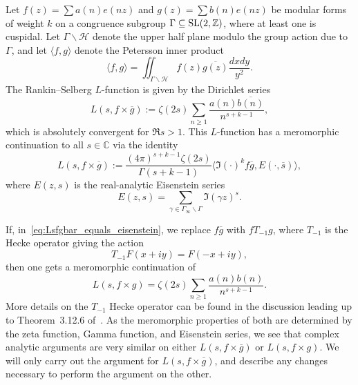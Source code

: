 Let $f(z) = \sum a(n) e(nz)$ and $g(z) = \sum b(n) e(nz)$ be modular forms of weight $k$
on a congruence subgroup $\Gamma \subseteq \operatorname{SL}(2, \mathbb{Z})$, where at least one is
cuspidal.
Let $\Gamma \backslash \mathcal{H}$ denote the upper half plane modulo the group action
due to $\Gamma$, and let $\langle f, g \rangle$ denote the Petersson inner product
\begin{equation}
  \langle f, g \rangle = \iint_{\Gamma \backslash \mathcal{H}} f(z) \overline{g(z)}
  \frac{dx dy}{y^2}.
\end{equation}
The Rankin--Selberg $L$-function is given by the Dirichlet series %
\begin{equation}
  L(s, f\times \overline{g}) := \zeta(2s) \sum_{n \geq 1} \frac{a(n) \overline{b(n)}}{n^{s
  + k - 1}},
\end{equation}
which is absolutely convergent for $\Re s > 1$.
This $L$-function has a meromorphic continuation to all $s \in \mathbb{C}$ via the
identity
\begin{equation}\label{eq:Lsfgbar_equals_eisenstein}
  L(s, f\times \overline{g}) := \frac{(4\pi)^{s + k - 1} \zeta(2s)}{\Gamma(s + k - 1)}
  \langle \Im(\cdot)^k f \overline{g}, E(\cdot, \overline{s})\rangle,
\end{equation}
where $E(z,s)$ is the real-analytic Eisenstein series
\begin{equation}\label{eq:eisenstein_def}
  E(z,s) = \sum_{\gamma \in \Gamma_\infty \backslash \Gamma} \Im(\gamma z)^s.
\end{equation}



If, in~\eqref{eq:Lsfgbar_equals_eisenstein}, we replace $f \overline{g}$ with $f T_{-1}g$,
where $T_{-1}$ is the Hecke operator giving the action
\begin{equation}
  T_{-1} F(x + iy) = F(-x + iy),
\end{equation}
then one gets a meromorphic continuation of
\begin{equation}
  L(s, f\times g) = \zeta(2s) \sum_{n \geq 1} \frac{a(n) b(n)}{n^{s + k - 1}}.
\end{equation}
More details on the $T_{-1}$ Hecke operator can be found in the discussion leading up to
Theorem~3.12.6 of~\cite{Goldfeld2006automorphic}.
As the meromorphic properties of both are determined by the zeta function, Gamma function,
and Eisenstein series, we see that complex analytic arguments are very similar on either
$L(s, f\times \overline{g})$ or $L(s, f\times g)$.
We will only carry out the argument for $L(s, f\times \overline{g})$, and
describe any changes necessary to perform the argument on the other.



